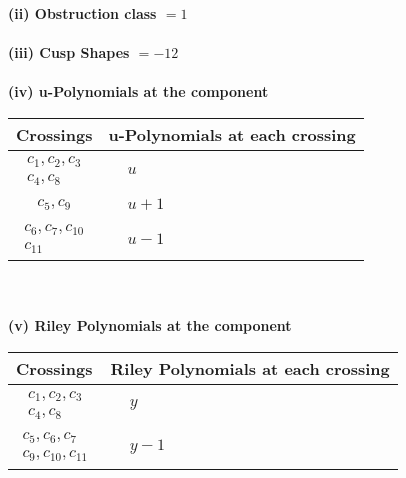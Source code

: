 \documentclass[1p]{elsarticle_modified}
\theoremstyle{definition}
\begin{document}
\flushleft \textbf{(ii) Obstruction class $= 1$}\\~\\
\flushleft \textbf{(iii) Cusp Shapes $= -12$}\\~\\
\newpage\renewcommand{\arraystretch}{1}
\flushleft \textbf{(iv) u-Polynomials at the component}\newline \\
\begin{tabular}{m{50pt}|m{274pt}}
Crossings & \hspace{64pt}u-Polynomials at each crossing \\
\hline $$\begin{aligned}c_{1},c_{2},c_{3}\\c_{4},c_{8}\end{aligned}$$&$\begin{aligned}
&u
\end{aligned}$\\
\hline $$\begin{aligned}c_{5},c_{9}\end{aligned}$$&$\begin{aligned}
&u+1
\end{aligned}$\\
\hline $$\begin{aligned}c_{6},c_{7},c_{10}\\c_{11}\end{aligned}$$&$\begin{aligned}
&u-1
\end{aligned}$\\
\hline
\end{tabular}\\~\\
\newpage\renewcommand{\arraystretch}{1}
\flushleft \textbf{(v) Riley Polynomials at the component}\newline \\
\begin{tabular}{m{50pt}|m{274pt}}
Crossings & \hspace{64pt}Riley Polynomials at each crossing \\
\hline $$\begin{aligned}c_{1},c_{2},c_{3}\\c_{4},c_{8}\end{aligned}$$&$\begin{aligned}
&y
\end{aligned}$\\
\hline $$\begin{aligned}c_{5},c_{6},c_{7}\\c_{9},c_{10},c_{11}\end{aligned}$$&$\begin{aligned}
&y-1
\end{aligned}$\\
\hline
\end{tabular}\\~\\
\end{document}
